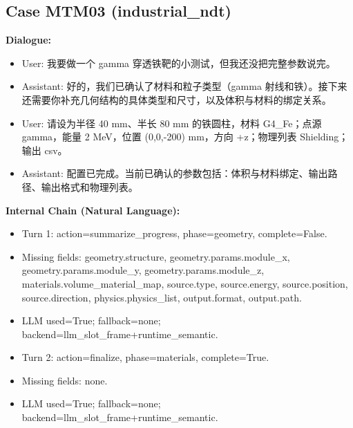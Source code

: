 \documentclass[11pt]{ctexart}
\begin{document}
\subsection{Case MTM03 (industrial\_ndt)}
\textbf{Dialogue:}
\begin{itemize}
\item User: 我要做一个 gamma 穿透铁靶的小测试，但我还没把完整参数说完。
\item Assistant: 好的，我们已确认了材料和粒子类型（gamma 射线和铁）。接下来还需要你补充几何结构的具体类型和尺寸，以及体积与材料的绑定关系。
\item User: 请设为半径 40 mm、半长 80 mm 的铁圆柱，材料 G4\_Fe；点源 gamma，能量 2 MeV，位置 (0,0,-200) mm，方向 +z；物理列表 Shielding；输出 csv。
\item Assistant: 配置已完成。当前已确认的参数包括：体积与材料绑定、输出路径、输出格式和物理列表。
\end{itemize}
\textbf{Internal Chain (Natural Language):}
\begin{itemize}
\item Turn 1: action=summarize\_progress, phase=geometry, complete=False.
\item Missing fields: geometry.structure, geometry.params.module\_x, geometry.params.module\_y, geometry.params.module\_z, materials.volume\_material\_map, source.type, source.energy, source.position, source.direction, physics.physics\_list, output.format, output.path.
\item LLM used=True; fallback=none; backend=llm\_slot\_frame+runtime\_semantic.
\item Turn 2: action=finalize, phase=materials, complete=True.
\item Missing fields: none.
\item LLM used=True; fallback=none; backend=llm\_slot\_frame+runtime\_semantic.
\end{itemize}
\end{document}
